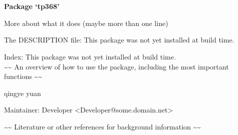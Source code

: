 \documentclass[a4paper]{book}
\begin{document}
\chapter*{}
\begin{center}
{\textbf{\huge Package `tp368'}}
\par\bigskip{\large \today}
\end{center}
\begin{description}
\raggedright{}
\item[Type]
\item[Title]
\item[Version]
\item[Date]
\item[Author]
\item[Maintainer]\AsIs{}
\item[Description]
\item[License]
\end{description}
%
\begin{Description}\relax
More about what it does (maybe more than one line)
\end{Description}
%
\begin{Details}\relax

The DESCRIPTION file:
This package was not yet installed at build time.\\{}

Index:  This package was not yet installed at build time.\\{}
\textasciitilde{}\textasciitilde{} An overview of how to use the package, including the most important functions \textasciitilde{}\textasciitilde{}
\end{Details}
%
\begin{Author}\relax
qingye yuan

Maintainer: Developer <Developer@some.domain.net>
\end{Author}
%
\begin{References}\relax
\textasciitilde{}\textasciitilde{} Literature or other references for background information \textasciitilde{}\textasciitilde{}
\end{References}
\end{document}
